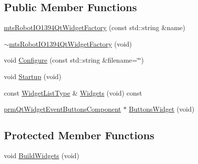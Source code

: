 \subsection*{Public Member Functions}
\begin{DoxyCompactItemize}
\item 
\hyperlink{classmts_robot_i_o1394_qt_widget_factory_a5af9f14113c1a8df00e5dcc6eec93c44}{mts\+Robot\+I\+O1394\+Qt\+Widget\+Factory} (const std\+::string \&name)
\item 
\hyperlink{classmts_robot_i_o1394_qt_widget_factory_aea31ad277310292acf320ea8551a5c29}{$\sim$mts\+Robot\+I\+O1394\+Qt\+Widget\+Factory} (void)
\item 
void \hyperlink{classmts_robot_i_o1394_qt_widget_factory_a38461e327f136bdfeb44bcc5facdc7a6}{Configure} (const std\+::string \&filename=\char`\"{}\char`\"{})
\item 
void \hyperlink{classmts_robot_i_o1394_qt_widget_factory_a39d213bdac308c273d5a6c630ea630c7}{Startup} (void)
\item 
const \hyperlink{classmts_robot_i_o1394_qt_widget_factory_aaa614e39fe48800dab4b21edf6845c22}{Widget\+List\+Type} \& \hyperlink{classmts_robot_i_o1394_qt_widget_factory_a9994bbd0f82c4a5790d048740baf34f3}{Widgets} (void) const 
\item 
\hyperlink{classprm_qt_widget_event_buttons_component}{prm\+Qt\+Widget\+Event\+Buttons\+Component} $\ast$ \hyperlink{classmts_robot_i_o1394_qt_widget_factory_ad87c9cb3b7864100eb976824a534976c}{Buttons\+Widget} (void)
\end{DoxyCompactItemize}
\subsection*{Protected Member Functions}
\begin{DoxyCompactItemize}
\item 
void \hyperlink{classmts_robot_i_o1394_qt_widget_factory_a2a585339c5e62006657cb9a0d6fc89d9}{Build\+Widgets} (void)
\end{DoxyCompactItemize}
